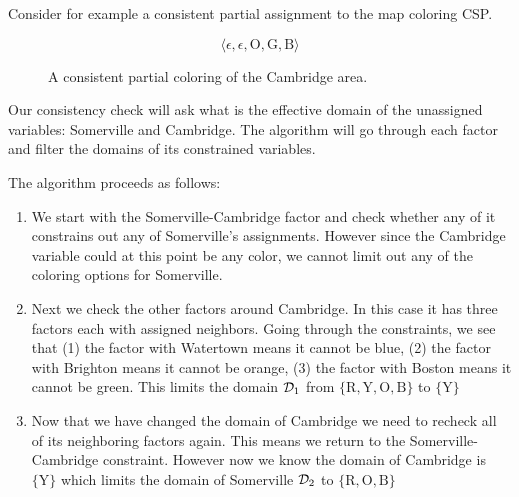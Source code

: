 \documentclass[11pt]{article}
\begin{document}
Consider for example a consistent partial assignment to the 
map coloring CSP.

\[\langle \epsilon, \epsilon, \mathrm{O, G, B} \rangle\]
\air 

\begin{figure}[h]
  \centering
  \label{fig:cambcolor}
  \caption{A consistent partial coloring of the Cambridge area. }
\end{figure}

Our consistency check will ask what is the effective domain 
of the unassigned variables: Somerville and Cambridge.
The algorithm will go through each factor and filter the domains of its constrained variables.
 
The algorithm proceeds as follows: 

\begin{enumerate}
\item We start with the Somerville-Cambridge factor and check whether any of 
  it constrains out any of Somerville's assignments. 
  However since the Cambridge variable could at this point be any 
  color, we cannot limit out any of the coloring options for Somerville.
\item Next we check the other factors around Cambridge. In this case it has three factors each
  with assigned neighbors.  Going through the constraints, we see that
  (1) the factor with Watertown means it cannot be blue, (2) the
  factor with Brighton means it cannot be orange, (3) the factor with
  Boston means it cannot be green. This limits the domain $\mathcal{D}_1$
  from $\{\mathrm{R,Y, O, B }\}$ to $\{\mathrm{Y}\}$
\item Now that we have changed the domain of Cambridge we need to
  recheck all of its neighboring factors again. This means we return
  to the Somerville-Cambridge constraint. However now we know the
  domain of Cambridge is $\{\mathrm{Y}\}$ which limits the domain of
  Somerville $\mathcal{D}_2$ to $\{\mathrm{R, O, B }\}$
\end{enumerate}
\end{document}
